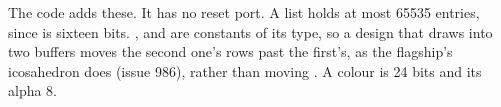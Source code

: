 The code adds these. It has no reset port. A list holds at most 65535
entries, since  is sixteen bits. , 
and  are constants of its type, so a design that draws
into two buffers moves the second one's rows past the first's, as the
flagship's icosahedron does (issue 986), rather than moving
. A colour is 24 bits and its alpha 8.
